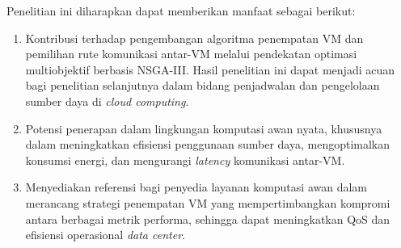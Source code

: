 Penelitian ini diharapkan dapat memberikan manfaat sebagai berikut:

\begin{enumerate}
  \item Kontribusi terhadap pengembangan algoritma penempatan VM dan pemilihan rute komunikasi antar-VM melalui pendekatan optimasi multiobjektif berbasis NSGA-III. Hasil penelitian ini dapat menjadi acuan bagi penelitian selanjutnya dalam bidang penjadwalan dan pengelolaan sumber daya di \textit{cloud computing}.
    
  \item Potensi penerapan dalam lingkungan komputasi awan nyata, khususnya dalam meningkatkan efisiensi penggunaan sumber daya, mengoptimalkan konsumsi energi, dan mengurangi \textit{latency} komunikasi antar-VM.
    
  \item Menyediakan referensi bagi penyedia layanan komputasi awan dalam merancang strategi penempatan VM yang mempertimbangkan kompromi antara berbagai metrik performa, sehingga dapat meningkatkan QoS dan efisiensi operasional \textit{data center}.
\end{enumerate}
